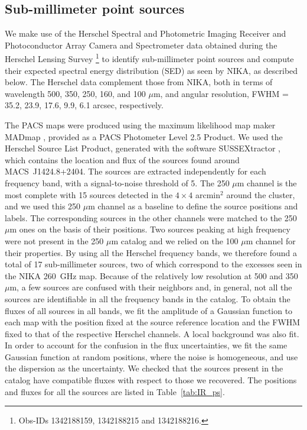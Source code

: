 \documentclass[traditabstract]{aa}
\begin{document}
\subsection{Sub-millimeter point sources}\label{sec:smmps}
We make use of the Herschel Spectral and Photometric Imaging Receiver \citep[SPIRE;][]{griffin2010} and Photoconductor Array Camera and Spectrometer \citep[PACS;][]{poglitsch2010} data obtained during the Herschel Lensing Survey \citep[HLS,][]{egami2010,rawle2012}\footnote{Obs-IDs 1342188159, 1342188215 and 1342188216.} to identify sub-millimeter point sources and compute their expected spectral energy distribution (SED) as seen by NIKA, as described below. The Herschel data complement those from  NIKA, both in terms of wavelength 500, 350, 250, 160, and 100 $\mu$m, and angular resolution, FWHM = 35.2, 23.9, 17.6, 9.9, 6.1 arcsec, respectively.

The PACS maps were produced using the maximum likelihood map maker MADmap \citep{cantalupo2010}, provided as a PACS Photometer Level 2.5 Product. We used the Herschel Source List Product, generated with the software SUSSEXtractor \citep{savage2007}, which contains the location and flux of the sources found around \mbox{MACS~J1424.8+2404}. The sources are extracted independently for each frequency band, with a signal-to-noise threshold of 5. The 250 $\mu$m channel is the most complete with 15 sources detected in the $4 \times 4$ arcmin$^2$ around the cluster, and we used this 250 $\mu$m channel as a baseline to define the source positions and labels. The corresponding sources in the other channels were matched to the 250 $\mu$m ones on the basis of their positions. Two sources peaking at high frequency were not present in the 250 $\mu$m catalog and we relied on the 100 $\mu$m channel for their properties. By using all the Herschel frequency bands, we therefore found a total of 17 sub-millimeter sources, two of which correspond to the excesses seen in the NIKA 260~GHz map. Because of the relatively low resolution at 500 and 350 $\mu$m, a few sources are confused with their neighbors and, in general, not all the sources are identifiable in all the frequency bands in the catalog. To obtain the fluxes of all sources in all bands, we fit the amplitude of a Gaussian function to each map with the position fixed at the source reference location and the FWHM fixed to that of the respective Herschel channels. A local background was also fit. In order to account for the confusion in the flux uncertainties, we fit the same Gaussian function at random positions, where the noise is homogeneous, and use the dispersion as the uncertainty. We checked that the sources present in the catalog have compatible fluxes with respect to those we recovered. The positions and fluxes for all the sources are listed in Table~\ref{tab:IR_ps}.
\end{document}
